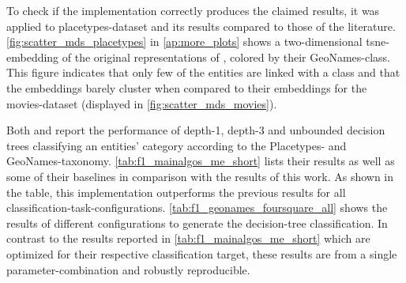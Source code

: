 To check if the implementation correctly produces the claimed results, it was applied to  placetypes-dataset and its results compared to those of the literature. \autoref{fig:scatter_mds_placetypes} in \autoref{ap:more_plots} shows a two-dimensional \gls{tsne}-embedding of the original representations of \cite{Derrac2015}, colored by their GeoNames-class. This figure indicates that only few of the entities are linked with a class and that the embeddings barely cluster when compared to their embeddings for the movies-dataset (displayed in \autoref{fig:scatter_mds_movies}). 

Both \cite{Ager2018} and \cite{Alshaikh2020} report the performance of depth-1, depth-3 and unbounded decision trees classifying an entities' category according to the Placetypes- and GeoNames-taxonomy. \autoref{tab:f1_mainalgos_me_short} lists their results as well as some of their baselines in comparison with the results of this work. As shown in the table, this implementation outperforms the previous results for all classification-task-configurations. \autoref{tab:f1_geonames_foursquare_all} shows the results of different configurations to generate the decision-tree classification. In contrast to the results reported in \autoref{tab:f1_mainalgos_me_short} which are optimized for their respective classification target, these results are from a single parameter-combination and robustly reproducible. 


